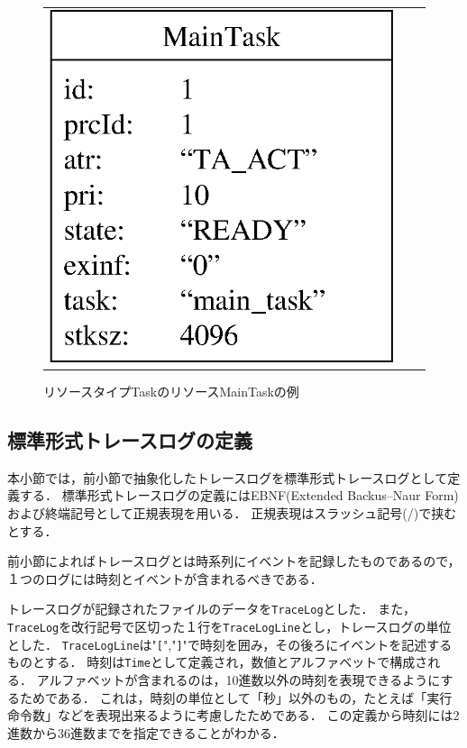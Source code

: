 \begin{figure}[h]
\begin{tabular}{ccc}
\begin{minipage}{0.3\hsize}
\begin{center}
\includegraphics[scale=0.5]{img/resourceSampleByTask.eps}
\caption{リソースタイプTaskのリソースMainTaskの例}
\label{fig:resourceSampleByTask}
\end{center}
\end{minipage}
\end{tabular}
\end{figure}

\clearpage

\subsection{標準形式トレースログの定義}

本小節では，前小節で抽象化したトレースログを標準形式トレースログとして定義する．
標準形式トレースログの定義にはEBNF(Extended Backus–Naur Form)および終端記号として正規表現を用いる．
正規表現はスラッシュ記号(/)で挟むとする．

前小節によればトレースログとは時系列にイベントを記録したものであるので，１つのログには時刻とイベントが含まれるべきである．


トレースログが記録されたファイルのデータを\verb|TraceLog|とした．
また，\verb|TraceLog|を改行記号で区切った１行を\verb|TraceLogLine|とし，トレースログの単位とした．
\verb|TraceLogLine|は"\verb|[|","\verb|]|"で時刻を囲み，その後ろにイベントを記述するものとする．
時刻は\verb|Time|として定義され，数値とアルファベットで構成される．
アルファベットが含まれるのは，10進数以外の時刻を表現できるようにするためである．
これは，時刻の単位として「秒」以外のもの，たとえば「実行命令数」などを表現出来るように考慮したためである．
この定義から時刻には2進数から36進数までを指定できることがわかる．

